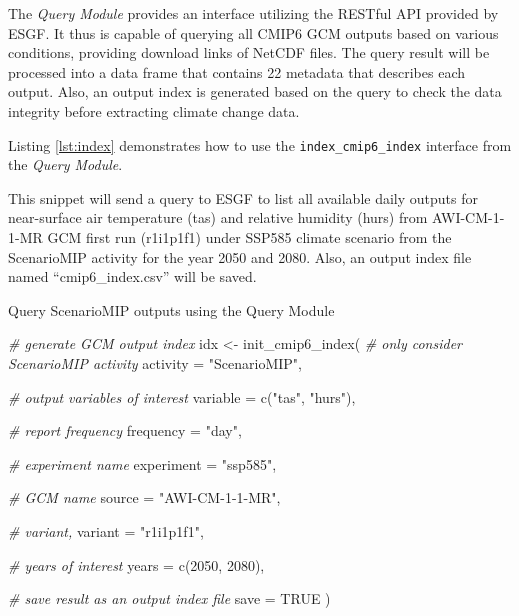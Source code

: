 \documentclass[twocolumn, a4paper,10pt]{article}
\newenvironment{Code}{\captionsetup{type=code}}{}
\newenvironment{Shaded}{\begin{mdframed}[skipabove=0pt]}{\end{mdframed}}
\newcommand{\AttributeTok}[1]{\textcolor[rgb]{0.77,0.63,0.00}{#1}}
\newcommand{\CommentTok}[1]{\textcolor[rgb]{0.56,0.35,0.01}{\textit{#1}}}
\newcommand{\ConstantTok}[1]{\textcolor[rgb]{0.00,0.00,0.00}{#1}}
\newcommand{\DecValTok}[1]{\textcolor[rgb]{0.00,0.00,0.81}{#1}}
\newcommand{\FunctionTok}[1]{\textcolor[rgb]{0.00,0.00,0.00}{#1}}
\newcommand{\NormalTok}[1]{#1}
\newcommand{\OtherTok}[1]{\textcolor[rgb]{0.56,0.35,0.01}{#1}}
\newcommand{\StringTok}[1]{\textcolor[rgb]{0.31,0.60,0.02}{#1}}
\begin{document}
The \emph{Query Module} provides an interface utilizing the RESTful API provided by
ESGF. It thus is capable of querying all CMIP6 GCM outputs based on various
conditions, providing download links of NetCDF files. The query result will be
processed into a data frame that contains 22 metadata that describes each
output. Also, an output index is generated based on the query to
check the data integrity before extracting climate change data.

Listing \ref{lst:index} demonstrates how to use the \texttt{index\_cmip6\_index}
interface from the \emph{Query Module}.

This snippet will send a query to ESGF to list all available daily outputs for
near-surface air temperature (tas) and relative humidity (hurs) from
AWI-CM-1-1-MR GCM first run (r1i1p1f1) under SSP585 climate scenario from the
ScenarioMIP activity for the year 2050 and 2080. Also, an output index file
named ``cmip6\_index.csv'' will be saved.

\begin{Code}
\caption{Query ScenarioMIP outputs using the Query Module}

\label{lst:index}

\begin{Shaded}
\begin{Highlighting}[]
\CommentTok{\# generate GCM output index}
\NormalTok{idx }\OtherTok{\textless{}{-}} \FunctionTok{init\_cmip6\_index}\NormalTok{(}
  \CommentTok{\# only consider ScenarioMIP activity}
  \AttributeTok{activity =} \StringTok{"ScenarioMIP"}\NormalTok{,}

  \CommentTok{\# output variables of interest}
  \AttributeTok{variable =} \FunctionTok{c}\NormalTok{(}\StringTok{"tas"}\NormalTok{, }\StringTok{"hurs"}\NormalTok{),}

  \CommentTok{\# report frequency}
  \AttributeTok{frequency =} \StringTok{"day"}\NormalTok{,}

  \CommentTok{\# experiment name}
  \AttributeTok{experiment =} \StringTok{"ssp585"}\NormalTok{,}

  \CommentTok{\# GCM name}
  \AttributeTok{source =} \StringTok{"AWI{-}CM{-}1{-}1{-}MR"}\NormalTok{,}

  \CommentTok{\# variant,}
  \AttributeTok{variant =} \StringTok{"r1i1p1f1"}\NormalTok{,}

  \CommentTok{\# years of interest}
  \AttributeTok{years =} \FunctionTok{c}\NormalTok{(}\DecValTok{2050}\NormalTok{, }\DecValTok{2080}\NormalTok{),}

  \CommentTok{\# save result as an output index file}
  \AttributeTok{save =} \ConstantTok{TRUE}
\NormalTok{)}
\end{Highlighting}
\end{Shaded}

\end{Code}
\end{document}
